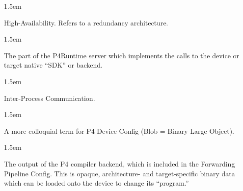 \documentclass[11pt]{article}
\begin{document}
{\begin{mddefinitions}

\begin{mdbmarginx}{}{}{}{1.5em}%
\begin{mddefdata}%
High-Availability. Refers to a redundancy architecture.
\end{mddefdata}%
\end{mdbmarginx}%


\begin{mdbmarginx}{}{}{}{1.5em}%
\begin{mddefdata}%
The part of the P4Runtime server which implements the calls to the device or
target native \textquotedblleft{}SDK\textquotedblright{} or backend.
\end{mddefdata}%
\end{mdbmarginx}%


\begin{mdbmarginx}{}{}{}{1.5em}%
\begin{mddefdata}%
Inter-Process Communication.
\end{mddefdata}%
\end{mdbmarginx}%


\begin{mdbmarginx}{}{}{}{1.5em}%
\begin{mddefdata}%
A more colloquial term for P4 Device Config (Blob = Binary Large Object).
\end{mddefdata}%
\end{mdbmarginx}%


\begin{mdbmarginx}{}{}{}{1.5em}%
\begin{mddefdata}%
The output of the P4 compiler backend, which is included in the Forwarding
Pipeline Config. This is opaque, architecture- and target-specific binary
data which can be loaded onto the device to change its \textquotedblleft{}program.\textquotedblright{}
\end{mddefdata}%
\end{mdbmarginx}%


\end{mddefinitions}}
\end{document}
